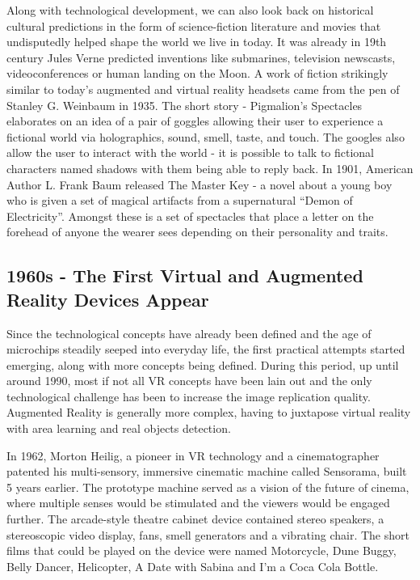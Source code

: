 \documentclass[12pt, a4paper]{article}
\begin{document}
Along with technological development, we can also look back on historical cultural predictions in the form of science-fiction literature and movies that undisputedly helped shape the world we live in today. It was already in 19th century Jules Verne predicted inventions like submarines, television newscasts, videoconferences or human landing on the Moon. A work of fiction strikingly similar to today’s augmented and virtual reality headsets came from the pen of  Stanley G. Weinbaum in 1935. The short story - Pigmalion’s Spectacles elaborates on an idea of a pair of goggles allowing their user to experience a fictional world via holographics, sound, smell, taste, and touch. The googles also allow the user to interact with the world - it is possible to talk to fictional characters named shadows with them being able to reply back. In 1901, American Author L. Frank Baum released The Master Key - a novel about a young boy who is given a set of magical artifacts from a supernatural “Demon of Electricity”. Amongst these is a set of spectacles that place a letter on the forehead of anyone the wearer sees depending on their personality and traits.

\subsection{1960s - The First Virtual and Augmented Reality Devices Appear}
Since the technological concepts have already been defined and the age of microchips steadily seeped into everyday life, the first practical attempts started emerging, along with more concepts being defined. During this period, up until around 1990, most if not all VR concepts have been lain out and the only technological challenge has been to increase the image replication quality. Augmented Reality is generally more complex, having to juxtapose virtual reality with area learning and real objects detection.

In 1962, Morton Heilig, a pioneer in VR technology and a cinematographer patented his multi-sensory, immersive cinematic machine called Sensorama, built 5 years earlier. The prototype machine served as a vision of the future of cinema, where multiple senses would be stimulated and the viewers would be engaged further. The arcade-style theatre cabinet device contained stereo speakers, a stereoscopic video display, fans, smell generators and a vibrating chair. The short films that could be played on the device were named Motorcycle, Dune Buggy, Belly Dancer, Helicopter, A Date with Sabina and I’m a Coca Cola Bottle.
\end{document}
